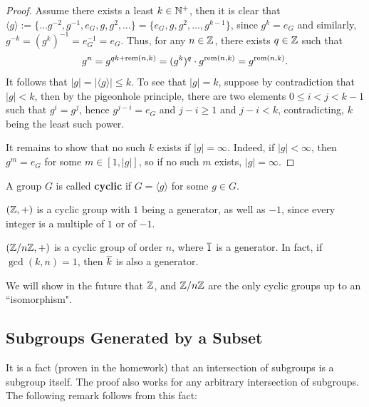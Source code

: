 \begin{proof}
   Assume there exists a least $k \in \mathbb{N}^+$, then it is clear that $\langle g \rangle := \{\dots g^{-2}, g^{-1}, e_G, g, g^2, \dots\} = \{e_G, g, g^2, \dots, g^{k-1}\} $, since $g^k = e_G$ and similarly, $g^{-k} = (g^k)^{-1} = e^{-1}_G = e_G$. Thus, for any $n \in \mathbb{Z}$, there exists $q \in \mathbb{Z}$ such that
   \[ g^n = g^{qk + \operatorname{rem}(n,k)} = (g^k)^q \cdot g^{\operatorname{rem}(n,k)} = g^{\operatorname{rem}(n,k)}. \] 
   It follows that $|g| = |\langle g \rangle| \leq k$. To see that $|g| = k$, suppose by contradiction that $|g| < k$, then by the pigeonhole principle, there are two elements $0 \leq i < j < k - 1$ such that $g^i = g^j$, hence $g^{j-i} = e_G$ and $j - i \geq 1$ and $j - i < k$, contradicting, $k$ being the least such power. 

   It remains to show that no such $k$ exists if $|g| = \infty$. Indeed, if $|g| < \infty$, then $g^m = e_G$ for some $m \in [1, |g|]$, so if no such $m$ exists, $|g| = \infty$. 
\end{proof}

\begin{defbox}
   A group $G$ is called \textbf{cyclic} if $G = \langle g \rangle$ for some $g \in G$. 
\end{defbox}

\begin{example}
   $(\mathbb{Z}, +)$ is a cyclic group with $1$ being a generator, as well as $-1$, since every integer is a multiple of $1$ or of $-1$. 
\end{example}
\begin{example}
   $(\mathbb{Z}/n\mathbb{Z}, +)$ is a  cyclic group of order $n$, where $\overline{1}$ is a generator. In fact, if $\gcd(k,n) = 1$, then $\overline{k}$ is also a generator. 
\end{example}

\begin{remark}
   We will show in the future that $\mathbb{Z}$, and $\mathbb{Z}/n\mathbb{Z}$ are the only cyclic groups up to an ``isomorphism".
\end{remark}

\subsection{Subgroups Generated by a Subset}

It is a fact (proven in the homework) that an intersection of subgroups is a subgroup itself. The proof also works for any arbitrary intersection of subgroups. The following remark follows from this fact:

